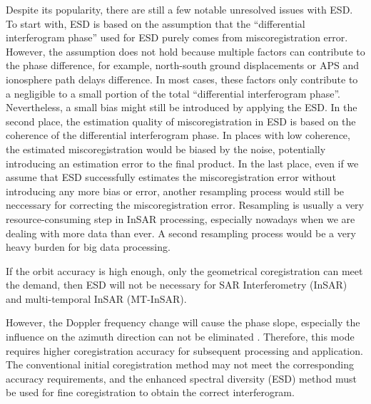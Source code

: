 \documentclass[preprint, authoryear]{elsarticle}
\begin{document}
Despite its popularity, there are still a few notable unresolved issues with ESD. To start with, ESD is based on the assumption that the ``differential interferogram phase'' used for ESD purely comes from miscoregistration error. However, the assumption does not hold because multiple factors can contribute to the phase difference, for example, north-south ground displacements or APS and ionosphere path delays difference. In most cases, these factors only contribute to a negligible to a small portion of the total ``differential interferogram phase''. Nevertheless, a small bias might still be introduced by applying the ESD. In the second place, the estimation quality of miscoregistration in ESD is based on the coherence of the differential interferogram phase. In places with low coherence, the estimated miscoregistration would be biased by the noise, potentially introducing an estimation error to the final product. In the last place, even if we assume that ESD successfully estimates the miscoregistration error without introducing any more bias or error, another resampling process would still be neccessary for correcting the miscoregistration error. Resampling is usually a very resource-consuming step in InSAR processing, especially nowadays when we are dealing with more data than ever. A second resampling process would be a very heavy burden for big data processing. 






If the orbit accuracy is high enough, only the geometrical coregistration can meet the demand, then ESD will not be necessary for SAR Interferometry (InSAR) and multi-temporal InSAR (MT-InSAR). \par










However, the Doppler frequency change will cause the phase slope, especially the influence on the azimuth direction can not be eliminated \cite{A_Study_of_Sentinel-1_TOPS_Mode_Co-registration}. Therefore, this mode requires higher coregistration accuracy for subsequent processing and application. The conventional initial coregistration method may not meet the corresponding accuracy requirements, and the enhanced spectral diversity (ESD) method must be used for fine coregistration to obtain the correct interferogram. \par
\end{document}
